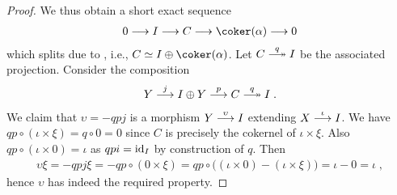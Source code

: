 \documentclass[a4paper,parskip=half,numbers=enddot, DIV=12]{scrreprt}
\begin{document}
\begin{proof}
	We thus obtain a short exact sequence
	\begin{align*}
		0\morphism I\morphism C\morphism\coker(\alpha)\morphism 0
	\end{align*}
	which splits due to , i.e., $C\simeq I\oplus \coker(\alpha)$. Let $C\epimorphism[q] I$ be the associated projection. Consider the composition
	\begin{align*}
		Y\morphism[j] I\oplus Y\morphism[p] C\epimorphism[q] I\;.
	\end{align*}
	We claim that $\upsilon=-qpj$ is a morphism $Y\morphism[\upsilon] I$ extending $X\morphism[\iota]I$. We have $qp\circ(\iota\times\xi)=q\circ0=0$ since $C$ is precisely the cokernel of $\iota\times\xi$. Also $qp\circ (\iota\times0)=\iota$ as $qpi=\operatorname{id}_I$ by construction of $q$. Then 
	\begin{align*}
		\upsilon\xi=-qpj\xi=-qp\circ(0\times\xi)=qp\circ\big((\iota\times 0)-(\iota\times\xi)\big)=\iota-0=\iota\;,
	\end{align*}
	hence $\upsilon$ has indeed the required property.
\end{proof}
\end{document}
